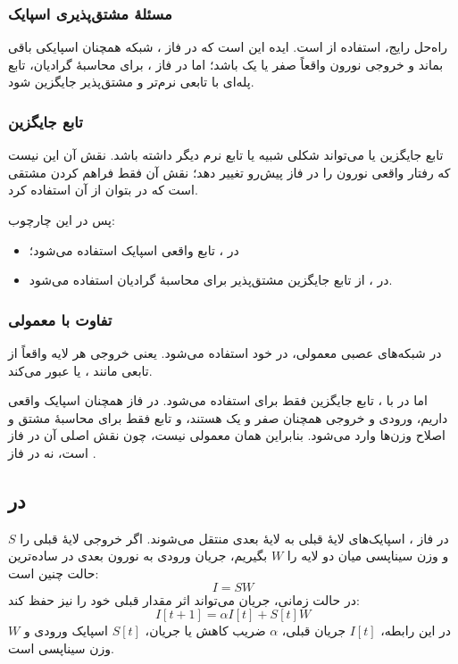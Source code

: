 \subsubsection{مسئلهٔ مشتق‌پذیری اسپایک}
راه‌حل رایج، استفاده از  است. ایده این است که در فاز ، شبکه همچنان اسپایکی باقی بماند و خروجی نورون واقعاً صفر یا یک باشد؛ اما در فاز ، برای محاسبهٔ گرادیان، تابع پله‌ای با تابعی نرم‌تر و مشتق‌پذیر جایگزین شود.

\subsubsection{تابع جایگزین}
تابع جایگزین یا  می‌تواند شکلی شبیه  یا تابع نرم دیگر داشته باشد. نقش آن این نیست که رفتار واقعی نورون را در فاز پیش‌رو تغییر دهد؛ نقش آن فقط فراهم کردن مشتقی است که در  بتوان از آن استفاده کرد.


پس در این چارچوب:
\begin{itemize}
  \item در ، تابع واقعی اسپایک استفاده می‌شود؛
  \item در ، از تابع جایگزین مشتق‌پذیر برای محاسبهٔ گرادیان استفاده می‌شود.
\end{itemize}

\subsubsection{تفاوت با  معمولی}
در شبکه‌های عصبی معمولی،  در خود  استفاده می‌شود. یعنی خروجی هر لایه واقعاً از تابعی مانند ،  یا  عبور می‌کند.

اما در  با ، تابع جایگزین فقط برای  استفاده می‌شود. در فاز  همچنان اسپایک واقعی داریم، ورودی و خروجی همچنان صفر و یک هستند، و تابع  فقط برای محاسبهٔ مشتق و اصلاح وزن‌ها وارد می‌شود. بنابراین  همان  معمولی نیست، چون نقش اصلی آن در فاز  است، نه در فاز .

\subsection{ در }
در فاز ، اسپایک‌های لایهٔ قبلی به لایهٔ بعدی منتقل می‌شوند. اگر خروجی لایهٔ قبلی را \(S\) و وزن سیناپسی میان دو لایه را \(W\) بگیریم، جریان ورودی به نورون بعدی در ساده‌ترین حالت چنین است:
\[
I = SW
\]
در حالت زمانی، جریان می‌تواند اثر مقدار قبلی خود را نیز حفظ کند:
\[
I[t+1] = \alpha I[t] + S[t]W
\]
در این رابطه، \(I[t]\) جریان قبلی، \(\alpha\) ضریب کاهش یا  جریان، \(S[t]\) اسپایک ورودی و \(W\) وزن سیناپسی است.

